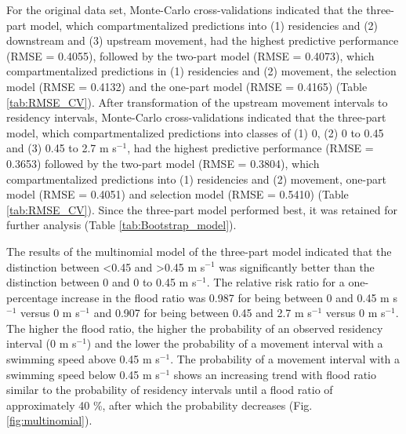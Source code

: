 \documentclass[preprint,12pt,authoryear]{elsarticle}
\begin{document}
For the original data set, Monte-Carlo cross-validations indicated that the three-part model, which compartmentalized predictions into (1) residencies and (2) downstream and (3) upstream movement, had the highest predictive performance (RMSE = 0.4055), followed by the two-part model (RMSE = 0.4073), which compartmentalized predictions in (1) residencies and (2) movement, the selection model (RMSE = 0.4132) and the one-part model (RMSE = 0.4165) (Table \ref{tab:RMSE_CV}). After transformation of the upstream movement intervals to residency intervals, Monte-Carlo cross-validations indicated that the three-part model, which compartmentalized predictions into classes of (1) 0, (2) 0 to 0.45 and (3) 0.45 to 2.7 m s$^{-1}$, had the highest predictive performance (RMSE = 0.3653) followed by the two-part model (RMSE = 0.3804), which compartmentalized predictions into (1) residencies and (2) movement, one-part model (RMSE = 0.4051) and selection model (RMSE = 0.5410) (Table \ref{tab:RMSE_CV}). Since the three-part model performed best, it was retained for further analysis (Table \ref{tab:Bootstrap_model}). 



The results of the multinomial model of the three-part model indicated that the distinction between <0.45 and >0.45 m s$^{-1}$ was significantly better than the distinction between 0 and 0 to 0.45 m s$^{-1}$. The relative risk ratio for a one-percentage increase in the flood ratio was 0.987 for being between 0 and 0.45 m s$^{-1}$ versus 0 m s$^{-1}$ and 0.907 for being between 0.45 and 2.7 m s$^{-1}$ versus 0 m s$^{-1}$. The higher the flood ratio, the higher the probability of an observed residency interval (0 m s$^{-1}$) and the lower the probability of a movement interval with a swimming speed above 0.45 m s$^{-1}$. The probability of a movement interval with a swimming speed below 0.45 m s$^{-1}$ shows an increasing trend with flood ratio similar to the probability of residency intervals until a flood ratio of approximately 40 \%, after which the probability decreases (Fig. \ref{fig:multinomial}). 
\end{document}

